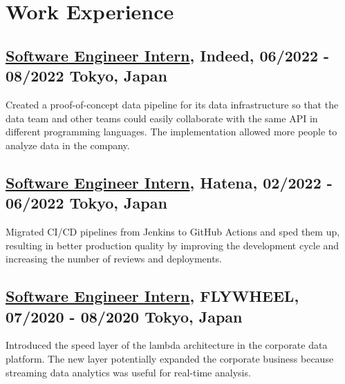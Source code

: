 \documentclass[10pt]{article}
\begin{document}
\section*{Work Experience}
  \subsection*{\underline{Software Engineer Intern}, Indeed, 06/2022 - 08/2022 \hfill Tokyo, Japan}
    Created a proof-of-concept data pipeline for its data infrastructure so that the data team and other teams could easily collaborate with the same API in different programming languages.
    The implementation allowed more people to analyze data in the company.
  \subsection*{\underline{Software Engineer Intern}, Hatena, 02/2022 - 06/2022 \hfill Tokyo, Japan}
    Migrated CI/CD pipelines from Jenkins to GitHub Actions and sped them up, resulting in better production quality by improving the development cycle and increasing the number of reviews and deployments.
  \subsection*{\underline{Software Engineer Intern}, FLYWHEEL, 07/2020 - 08/2020 \hfill Tokyo, Japan}
    Introduced the speed layer of the lambda architecture in the corporate data platform.
    The new layer potentially expanded the corporate business because streaming data analytics was useful for real-time analysis.
\end{document}
